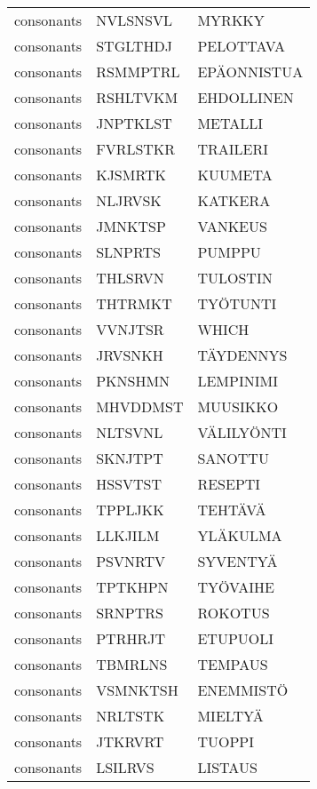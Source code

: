 \begin{tabular}{lll}
 consonants &  NVLSNSVL &             MYRKKY \\
 consonants &  STGLTHDJ &          PELOTTAVA \\
 consonants &  RSMMPTRL &        EPÄONNISTUA \\
 consonants &  RSHLTVKM &         EHDOLLINEN \\
 consonants &  JNPTKLST &            METALLI \\
 consonants &  FVRLSTKR &           TRAILERI \\
 consonants &   KJSMRTK &            KUUMETA \\
 consonants &   NLJRVSK &            KATKERA \\
 consonants &   JMNKTSP &            VANKEUS \\
 consonants &   SLNPRTS &             PUMPPU \\
 consonants &   THLSRVN &           TULOSTIN \\
 consonants &   THTRMKT &           TYÖTUNTI \\
 consonants &   VVNJTSR &              WHICH \\
 consonants &   JRVSNKH &          TÄYDENNYS \\
 consonants &   PKNSHMN &          LEMPINIMI \\
 consonants &  MHVDDMST &           MUUSIKKO \\
 consonants &   NLTSVNL &         VÄLILYÖNTI \\
 consonants &   SKNJTPT &            SANOTTU \\
 consonants &   HSSVTST &            RESEPTI \\
 consonants &   TPPLJKK &            TEHTÄVÄ \\
 consonants &   LLKJILM &           YLÄKULMA \\
 consonants &   PSVNRTV &           SYVENTYÄ \\
 consonants &   TPTKHPN &           TYÖVAIHE \\
 consonants &   SRNPTRS &            ROKOTUS \\
 consonants &   PTRHRJT &           ETUPUOLI \\
 consonants &   TBMRLNS &            TEMPAUS \\
 consonants &  VSMNKTSH &          ENEMMISTÖ \\
 consonants &   NRLTSTK &            MIELTYÄ \\
 consonants &   JTKRVRT &             TUOPPI \\
 consonants &   LSILRVS &            LISTAUS \\

\end{tabular}
